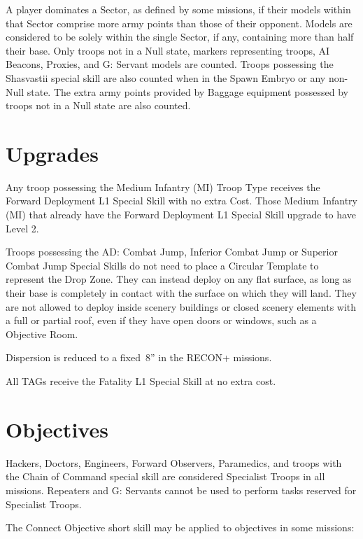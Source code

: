   A player dominates a Sector, as defined by
some missions, if their models within that Sector comprise more army
points than those of their opponent.  Models are considered to be
solely within the single Sector, if any, containing more than half
their base.  Only troops not in a Null state, markers representing
troops, AI Beacons, Proxies, and G: Servant models are counted.
Troops possessing the Shasvastii special skill are also counted when
in the Spawn Embryo or any non-Null state.  The extra army points
provided by Baggage equipment possessed by troops not in a Null state
are also counted.

\section{Upgrades}

  Any troop possessing the Medium Infantry (MI)
Troop Type receives the Forward Deployment L1 Special Skill with no
extra Cost.  Those Medium Infantry (MI) that already have the Forward
Deployment L1 Special Skill upgrade to have Level 2.

  Troops possessing the AD: Combat
Jump, Inferior Combat Jump or Superior Combat Jump Special Skills do
not need to place a Circular Template to represent the Drop Zone.
They can instead deploy on any flat surface, as long as their base is
completely in contact with the surface on which they will land.  They
are not allowed to deploy inside scenery buildings or closed scenery
elements with a full or partial roof, even if they have open doors or
windows, such as a Objective Room.

Dispersion is reduced to a fixed~8'' in the RECON+ missions.

  All TAGs receive the Fatality L1 Special
Skill at no extra cost.

\section{Objectives}

  Hackers, Doctors, Engineers, Forward
Observers, Paramedics, and troops with the Chain of Command special
skill are considered Specialist Troops in all missions.  Repeaters and
G: Servants cannot be used to perform tasks reserved for Specialist
Troops.

 The Connect Objective short skill may
be applied to objectives in some missions:

